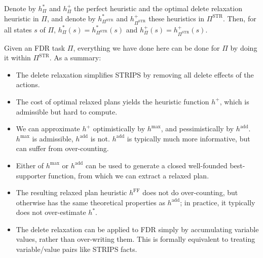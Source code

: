 \documentclass[10pt, letterpaper]{report}
\begin{document}
\begin{proposition}
Denote by $h^*_\Pi$ and $h^+_\Pi$ the perfect heuristic and the optimal delete relaxation heuristic in $\Pi$, and denote by $h^*_{\Pi^{\text{STR}}}$ and $h^+_{\Pi^{\text{STR}}}$ these heuristics in $\Pi^{\text{STR}}$. Then, for all states $s$ of $\Pi$, $h^*_\Pi(s) = h^*_{\Pi^{\text{STR}}}(s)$ and $h^+_\Pi(s) = h^+_{\Pi^{\text{STR}}}(s)$.
\end{proposition}

Given an FDR task $\Pi$, everything we have done here can be done for $\Pi$ by doing it within $\Pi^{\text{STR}}$. As a summary:

\begin{itemize}
    \item The delete relaxation simplifies STRIPS by removing all delete effects of the actions.
    \item The cost of optimal relaxed plans yields the heuristic function $h^+$, which is admissible but hard to compute.
    \item We can approximate $h^+$ optimistically by $h^{\max}$, and pessimistically by $h^{\text{add}}$. $h^{\max}$ is admissible, $h^{\text{add}}$ is not. $h^{\text{add}}$ is typically much more informative, but can suffer from over-counting.
    \item Either of $h^{\max}$ or $h^{\text{add}}$ can be used to generate a closed well-founded best-supporter function, from which we can extract a relaxed plan.
    \item The resulting relaxed plan heuristic $h^{\text{FF}}$ does not do over-counting, but otherwise has the same theoretical properties as $h^{\text{add}}$; in practice, it typically does not over-estimate $h^*$.
    \item The delete relaxation can be applied to FDR simply by accumulating variable values, rather than over-writing them. This is formally equivalent to treating variable/value pairs like STRIPS facts.
\end{itemize}
\end{document}
